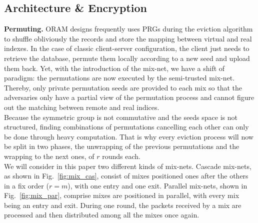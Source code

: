 \documentclass{llncs}
\begin{document}
\subsection{Architecture \& Encryption}\label{Arch}
%
\noindent\textbf{Permuting.} ORAM designs frequently uses PRGs during the eviction algorithm to shuffle obliviously the records and store the mapping between virtual and real indexes.
In the case of classic client-server configuration, the client just needs to retrieve the database, permute them locally according to a new seed and upload them back. Yet, with the introduction of the mix-net, we have a shift of paradigm: the permutations are now executed by the semi-trusted mix-net. Thereby, only private permutation seeds are provided to each mix so that the adversaries only have a partial view of the permutation process and cannot figure out the matching between remote and real indices.\\
Because the symmetric group is not commutative and the seeds space is not structured, finding combinations of permutations cancelling each other can only be done through heavy computation. That is why every eviction process will now be split in two phases, the unwrapping of the previous permutations and the wrapping to the next ones, of $r$ rounds each.\\
We will consider in this paper two different kinds of mix-nets. Cascade mix-nets, as shown in Fig.~\ref{fig:mix_cas}, consist of mixes positioned ones after the others in a fix order ($r=m$), with one entry and one exit. Parallel mix-nets, shown in Fig.~\ref{fig:mix_par}, comprise mixes are positioned in parallel, with every mix being an entry and exit. During one round, the packets received by a mix are processed and then distributed among all the mixes once again.\\
\end{document}
